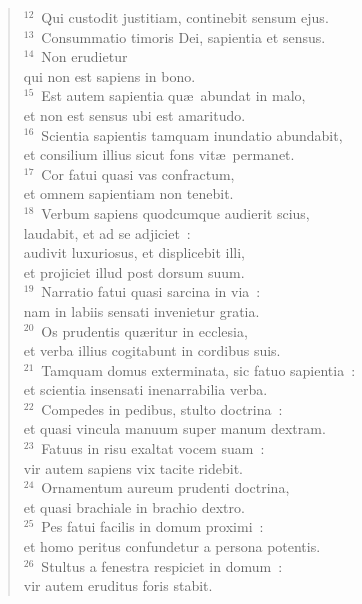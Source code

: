 \begin{flushleft}\begin{verse}${}^{12}$~Qui custodit justitiam, continebit sensum ejus.\\
${}^{13}$~Consummatio timoris Dei, sapientia et sensus.\\
${}^{14}$~Non erudietur\\ qui non est sapiens in bono.\\
${}^{15}$~Est autem sapientia qu\ae\ abundat in malo,\\ et non est sensus ubi est amaritudo.\\
${}^{16}$~Scientia sapientis tamquam inundatio abundabit,\\ et consilium illius sicut fons vit\ae\ permanet.\\
${}^{17}$~Cor fatui quasi vas confractum,\\ et omnem sapientiam non tenebit.\\
${}^{18}$~Verbum sapiens quodcumque audierit scius,\\ laudabit, et ad se adjiciet~:\\ audivit luxuriosus, et displicebit illi,\\ et projiciet illud post dorsum suum.\\
${}^{19}$~Narratio fatui quasi sarcina in via~:\\ nam in labiis sensati invenietur gratia.\\
${}^{20}$~Os prudentis qu\ae ritur in ecclesia,\\ et verba illius cogitabunt in cordibus suis.\\
${}^{21}$~Tamquam domus exterminata, sic fatuo sapientia~:\\ et scientia insensati inenarrabilia verba.\\
${}^{22}$~Compedes in pedibus, stulto doctrina~:\\ et quasi vincula manuum super manum dextram.\\
${}^{23}$~Fatuus in risu exaltat vocem suam~:\\ vir autem sapiens vix tacite ridebit.\\
${}^{24}$~Ornamentum aureum prudenti doctrina,\\ et quasi brachiale in brachio dextro.\\
${}^{25}$~Pes fatui facilis in domum proximi~:\\ et homo peritus confundetur a persona potentis.\\
${}^{26}$~Stultus a fenestra respiciet in domum~:\\ vir autem eruditus foris stabit.\\

\end{verse}
\end{flushleft}

